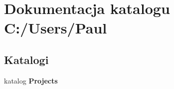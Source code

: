 \section{Dokumentacja katalogu C\+:/\+Users/\+Paul}
\label{dir_607454d63df89cc26e68885a7864ecc0}
\subsection*{Katalogi}
\begin{DoxyCompactItemize}
\item 
katalog {\bf Projects}
\end{DoxyCompactItemize}
